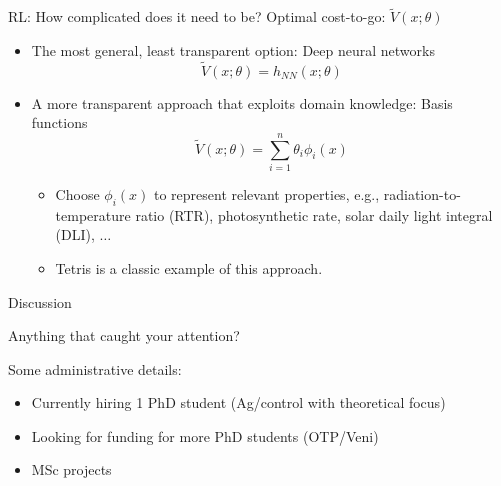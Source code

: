 \documentclass[xcolor=dvipsnames,aspectratio=169]{beamer}
\begin{document}
\begin{frame}{RL: How complicated does it need to be?}
	Optimal cost-to-go: $\tilde{V}(x;\theta)$ 
	\begin{itemize}
		\item The most general, least transparent option: Deep neural networks 
		\begin{equation*}
			\tilde{V}(x;\theta) = h_{NN}(x;\theta) 
		\end{equation*}
		\pause
		\item A more transparent approach that exploits domain knowledge: 
		Basis functions
		\begin{equation*}
			\tilde{V}(x;\theta) = \sum_{i=1}^{n}\theta_i \phi_i(x)
		\end{equation*}
		\begin{itemize}
			\item Choose $\phi_i(x)$ to represent relevant properties, e.g., 
			radiation-to-temperature ratio (RTR), photosynthetic rate, solar 
			daily light integral (DLI), $\dots$ 
			\item Tetris is a classic example of this approach.
		\end{itemize}
	\end{itemize}
\end{frame}

\begin{frame}{Discussion}
	\begin{center}
		Anything that caught your attention? 
	\end{center}
	Some administrative details:
	\begin{itemize}
		\item Currently hiring 1 PhD student (Ag/control with theoretical focus)
		\item Looking for funding for more PhD students (OTP/Veni)
		\item MSc projects
	\end{itemize}
\end{frame}

{
	\frame[noframenumbering]{\titlepage}
}
\end{document}
